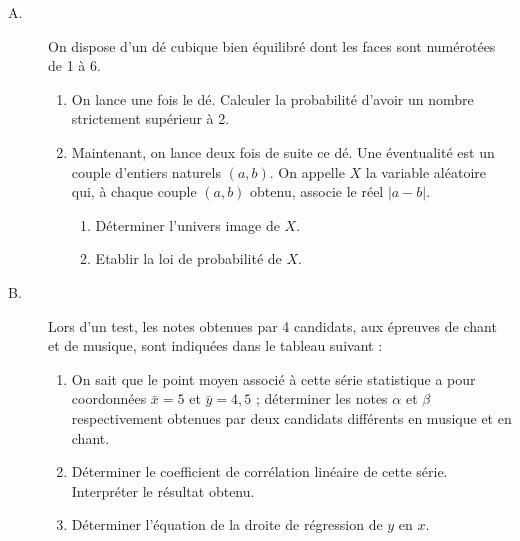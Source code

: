       \begin{description}
            \item[A. ]
                  On dispose d'un d\'e cubique bien \'equilibr\'e dont les faces sont num\'erot\'ees de 1 \`a 6.
                  \begin{enumerate}
                        \item On lance une fois le d\'e.
                              Calculer la probabilit\'e d'avoir un nombre strictement sup\'erieur \`a 2.
                        \item Maintenant, on lance deux fois de suite ce d\'e. 
                              Une \'eventualit\'e est un couple d'entiers naturels $(a,b)$.
                              On appelle $X$ la variable al\'eatoire qui, \`a chaque couple $(a,b)$ obtenu, 
                              associe le r\'eel $|a-b|$.
                              \begin{enumerate}
                                    \item D\'eterminer l'univers image de $X$.
                                    \item Etablir la loi de probabilit\'e de $X$.
                              \end{enumerate}
                  \end{enumerate}
            \item[B. ]
                  Lors d'un test, les notes obtenues par 4 candidats, aux \'epreuves de chant et de musique,
                  sont indiqu\'ees dans le tableau suivant :
                  \par\smallskip\noindent
                  \par\smallskip
                  \begin{enumerate}
                        \item On sait que le point moyen associ\'e \`a cette s\'erie statistique a pour coordonn\'ees 
                              $\bar{x} = 5$ et $\bar{y} = 4,5$ ;
                              d\'eterminer les notes $\alpha$ et $\beta$ respectivement obtenues par deux candidats diff\'erents
                              en musique et en chant.
                        \item D\'eterminer le coefficient de corr\'elation lin\'eaire de cette s\'erie.
                              Interpr\'eter le r\'esultat obtenu.
                        \item D\'eterminer l'\'equation de la droite de r\'egression de $y$ en $x$.
                  \end{enumerate}
      \end{description}
